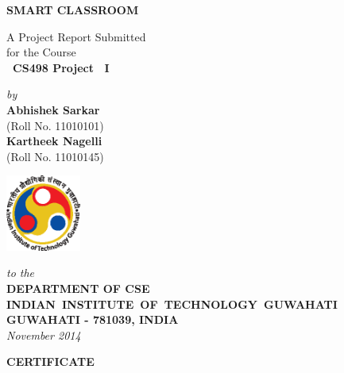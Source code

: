 \documentclass[12pt,a4paper]{report}
\theoremstyle{plain}
\theoremstyle{definition}
\theoremstyle{remark}
\begin{document}
\long{}



\begin{titlepage}
\enlargethispage{3cm}

\begin{center}

\vspace*{-2cm}

\textbf{\Large SMART CLASSROOM}

\vfill

 A Project Report Submitted \\
for the Course \\[1cm]

{\bf\Large\ CS498 Project ~I }\\[.1in]

 \vfill

{\large \emph{by}}\\[5pt]
{\large\bf {Abhishek Sarkar}}\\[5pt]
{\large (Roll No. 11010101)}\\
{\large\bf {Kartheek Nagelli}}\\[5pt]
{\large (Roll No. 11010145)}

\vfill
\includegraphics[height=2.5cm]{iitglogo}

\vspace*{0.5cm}

{\em\large to the}\\[10pt]
{\bf\large DEPARTMENT OF CSE} \\[5pt]
{\bf\large \mbox{INDIAN INSTITUTE OF TECHNOLOGY GUWAHATI}}\\[5pt]
{\bf\large GUWAHATI - 781039, INDIA}\\[10pt]
{\it\large November 2014}
\end{center}

\end{titlepage}

\clearpage

 \setcounter{page}{2}
\begin{center}
{\Large{\bf{CERTIFICATE}}}
\end{center}
\end{document}
